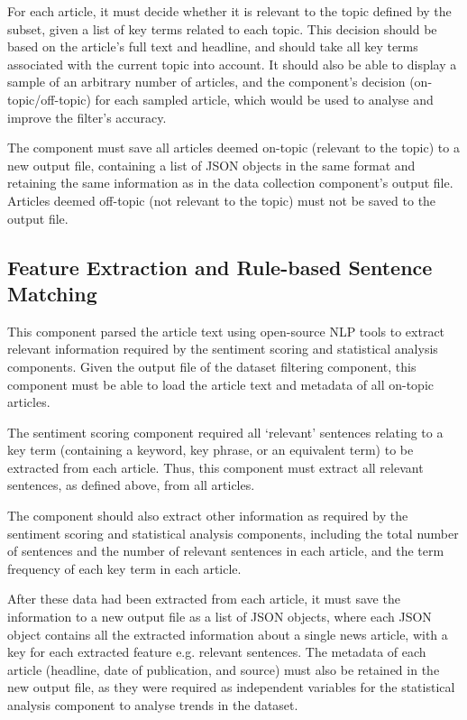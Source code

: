 \documentclass{report}
\begin{document}
For each article, it must decide whether it is relevant to the topic defined by the subset, given a list of key terms related to each topic.
This decision should be based on the article's full text and headline, and should take all key terms associated with the current topic into account.
It should also be able to display a sample of an arbitrary number of articles, and the component's decision (on-topic/off-topic) for each sampled article, which would be used to analyse and improve the filter's accuracy.

The component must save all articles deemed on-topic (relevant to the topic) to a new output file, containing a list of JSON objects in the same format and retaining the same information as in the data collection component's output file.
Articles deemed off-topic (not relevant to the topic) must not be saved to the output file.

\subsection{Feature Extraction and Rule-based Sentence Matching} \label{req-matching}

This component parsed the article text using open-source NLP tools to extract relevant information required by the sentiment scoring and statistical analysis components.
Given the output file of the dataset filtering component, this component must be able to load the article text and metadata of all on-topic articles.

The sentiment scoring component required all `relevant' sentences relating to a key term (containing a keyword, key phrase, or an equivalent term) to be extracted from each article.
Thus, this component must extract all relevant sentences, as defined above, from all articles.

The component should also extract other information as required by the sentiment scoring and statistical analysis components, including the total number of sentences and the number of relevant sentences in each article, and the term frequency of each key term in each article.

After these data had been extracted from each article, it must save the information to a new output file as a list of JSON objects, where each JSON object contains all the extracted information about a single news article, with a key for each extracted feature e.g. relevant sentences.
The metadata of each article (headline, date of publication, and source) must also be retained in the new output file, as they were required as independent variables for the statistical analysis component to analyse trends in the dataset.
\end{document}
